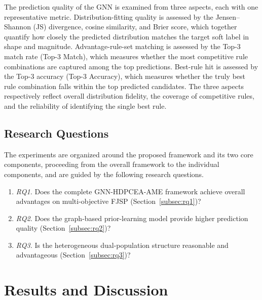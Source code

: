 \documentclass[pdflatex,iicol,Numbered,sn-basic]{sn-jnl}
\begin{document}
The prediction quality of the GNN is examined from three aspects, each with one representative metric.
Distribution-fitting quality is assessed by the Jensen--Shannon (JS) divergence, cosine similarity, and Brier score, which together quantify how closely the predicted distribution matches the target soft label in shape and magnitude.
Advantage-rule-set matching is assessed by the Top-3 match rate (Top-3 Match), which measures whether the most competitive rule combinations are captured among the top predictions.
Best-rule hit is assessed by the Top-3 accuracy (Top-3 Accuracy), which measures whether the truly best rule combination falls within the top predicted candidates.
The three aspects respectively reflect overall distribution fidelity, the coverage of competitive rules, and the reliability of identifying the single best rule.




















\subsection{Research Questions}\label{subsec:rqs}

The experiments are organized around the proposed framework and its two core components, proceeding from the overall framework to the individual components, and are guided by the following research questions.

\begin{enumerate}
  \item \textit{RQ1.} Does the complete GNN-HDPCEA-AME framework achieve overall advantages on multi-objective FJSP (Section~\ref{subsec:rq1})?

  \item \textit{RQ2.} Does the graph-based prior-learning model provide higher prediction quality (Section~\ref{subsec:rq2})?

  \item \textit{RQ3.} Is the heterogeneous dual-population structure reasonable and advantageous (Section~\ref{subsec:rq3})?

\end{enumerate}

\section{Results and Discussion}\label{sec:results}
\end{document}
